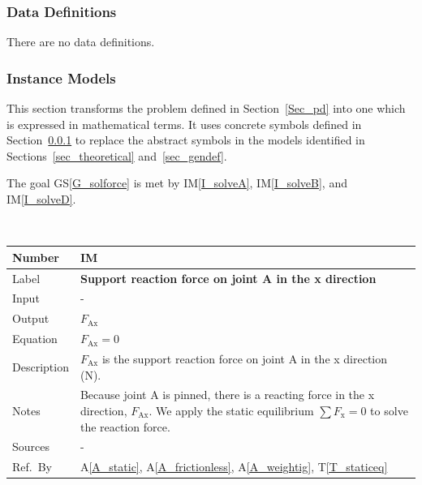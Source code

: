 \documentclass[12pt]{article}
\newcommand{\colAwidth}{0.13\textwidth}
\newcommand{\colBwidth}{0.82\textwidth}
\newcommand{\tref}[1]{T\ref{#1}}
\newcommand{\aref}[1]{A\ref{#1}}
\newcommand{\gsref}[1]{GS\ref{#1}}
\newcounter{instnum} %
\newcommand{\iref}[1]{IM\ref{#1}}
\begin{document}
\subsubsection{Data Definitions}\label{sec_datadef}

There are no data definitions.

\subsubsection{Instance Models} \label{sec_instance}    

This section transforms the problem defined in Section~\ref{Sec_pd} into 
one which is expressed in mathematical terms. It uses concrete symbols defined 
in Section~\ref{sec_datadef} to replace the abstract symbols in the models 
identified in Sections~\ref{sec_theoretical} and~\ref{sec_gendef}.

The goal \gsref{G_solforce} is met by \iref{I_solveA}, \iref{I_solveB}, and 
\iref{I_solveD}.

~\newline


\noindent
\begin{minipage}{\textwidth}
	\renewcommand*{\arraystretch}{1.5}
	\begin{tabular}{| p{\colAwidth} | p{\colBwidth}|}
		\hline
		\rowcolor[gray]{0.9}
		Number& IM{instnum}\theinstnum \label{I_solveFax}\\
		\hline
		Label& \bf Support reaction force on joint A in the x direction\\
		\hline
		Input& - \\
		\hline
		Output& $F_{\text{{Ax}}}$ \\
		\hline
		Equation& $F_{\text{Ax}} = 0$ \\
		\hline
		Description&$F_{\text{Ax}}$ is the support reaction force on joint A 
		in the x direction (N). \\
		\hline
		Notes& Because joint A is pinned, there is a reacting force in the x 
		direction, $F_{\text{Ax}}$. We apply the static equilibrium $\sum 
		F_{\text{x}} = 0$ to solve the reaction force. \\
		\hline
		Sources& - \\
		\hline
		Ref.\ By & \aref{A_static}, \aref{A_frictionless}, \aref{A_weightig}, 
		\tref{T_staticeq} \\
		\hline
	\end{tabular}
\end{minipage}\\
\end{document}
